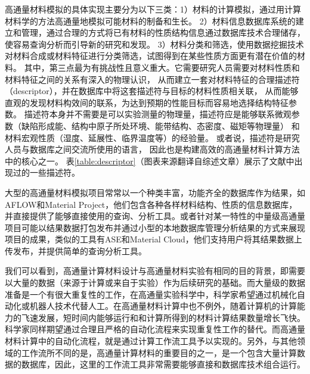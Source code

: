 高通量材料模拟的具体实现主要分为以下三类：1）材料的计算模拟，通过用计算材料学的方法高通量地模拟可能材料的制备和生长。
2）材料信息数据库系统的建立和管理，通过合理的方式将已有材料的性质结构信息通过数据库技术合理储存，使容易查询分析而引导新的研究和发现。
3）材料分类和筛选，使用数据挖掘技术对材料合成或材料特征进行分类筛选，试图得到在某些性质方面更有潜在价值的材料。
其中，第三点最为有挑战性且意义重大。它需要研究人员需要对材料性质和材料特征之间的关系有深入的物理认识，
从而建立一套对材料特征的合理描述符（descriptor），并在数据库中将这套描述符与目标的材料性质相关联，
从而能够直观的发现材料构效间的联系，为达到预期的性能目标而容易地选择结构特征参数。
描述符本身并不需要是可以实验测量的物理量，描述符应是能够联系微观参数（缺陷形成能、结构中原子所处环境、能带结构、态密度、磁矩等物理量）
和材料宏观性质（湿度、延展性、临界温度等）的经验量。
或者说，描述符是研究人员与数据库之间交流所使用的语言\cite{curtarolo2013high}，
因此也是构建高效的高通量材料计算方法中的核心之一。
表\ref{table:descriptor}（图表来源翻译自综述文章\cite{curtarolo2013high}）展示了文献中出现过的一些描述符。

大型的高通量材料模拟项目常常以一个种类丰富，功能齐全的数据库作为结果，如AFLOW\cite{curtarolo2012aflowlib}和Material Project\cite{jain2011high}，他们包含各种各样材料结构、性质的信息数据库，并直接提供了能够直接使用的查询、分析工具。或者针对某一特性的中量级高通量项目可能以结果数据打包发布并通过小型的本地数据库管理分析结果的方式来展现项目的成果，类似的工具有ASE\cite{larsen2017atomic}和Material Cloud\cite{talirz2020materials}，他们支持用户将其结果数据上传发布，并提供简单的查询分析工具。

我们可以看到，高通量计算材料设计与高通量材料实验有相同的目的背景，即需要以大量的数据（来源于计算或来自于实验）作为后续研究的基础。而大量级的数据准备是一个有很大重复性的工作，在高通量实验科学中，科学家希望通过机械化自动化或机器人技术代替人工。在高通量材料计算中也不例外，随着计算机的计算能力的飞速发展，短时间内能够运行和和计算所得到的材料计算结果数量增长飞快。科学家同样期望通过合理且严格的自动化流程来实现重复性工作的替代。而高通量材料计算中的自动化流程，就是通过计算工作流工具予以实现的。另外，与其他领域的工作流所不同的是，高通量计算材料的重要目的之一，是一个包含大量计算数据的数据库，因此，这里的工作流工具非常需要能够直接和数据库技术组合运行。

